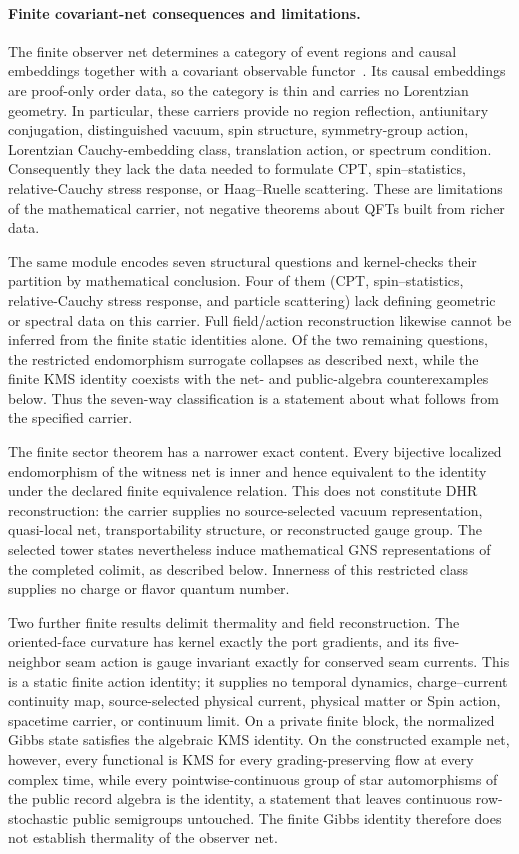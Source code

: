 \paragraph{Finite covariant-net consequences and limitations.}
The finite observer net determines a category of event regions and causal
embeddings together with a covariant observable functor~\cite{ophrepo}.  Its causal embeddings are
proof-only order data, so the category is thin and carries no Lorentzian
geometry.  In particular, these carriers provide no region reflection,
antiunitary conjugation, distinguished vacuum, spin structure, symmetry-group
action, Lorentzian Cauchy-embedding class, translation action, or spectrum condition.
Consequently they lack the data needed to formulate CPT, spin--statistics,
relative-Cauchy
stress response, or Haag--Ruelle scattering.  These are limitations of the
mathematical carrier, not negative theorems about QFTs built from richer
data.

The same module encodes seven structural questions and kernel-checks their
partition by mathematical conclusion.  Four of them (CPT, spin--statistics,
relative-Cauchy stress response, and particle scattering) lack defining
geometric or spectral data on this carrier.  Full field/action reconstruction
likewise cannot be inferred from the finite static identities alone.  Of the
two remaining questions, the restricted endomorphism surrogate collapses as
described next, while the finite KMS identity coexists with the net- and
public-algebra counterexamples below.  Thus the seven-way classification is a
statement about what follows from the specified carrier.

The finite sector theorem has a narrower exact content.  Every bijective
localized endomorphism of the witness net is inner and hence equivalent to the
identity under the declared finite equivalence relation.  This does not constitute DHR
reconstruction: the carrier supplies no source-selected vacuum
representation, quasi-local net, transportability structure, or reconstructed
gauge group.  The selected tower states nevertheless induce mathematical GNS
representations of the completed colimit, as described below.
Innerness of this restricted class supplies no charge or flavor quantum
number.

Two further finite results delimit thermality and field reconstruction.  The
oriented-face curvature has kernel exactly the port gradients, and its
five-neighbor seam action is gauge invariant exactly for conserved seam
currents.  This is a static finite action identity; it supplies no temporal
dynamics, charge--current continuity map, source-selected physical current,
physical matter or Spin action, spacetime carrier, or continuum limit.  On a
private finite block, the normalized Gibbs state satisfies the algebraic KMS
identity.  On the constructed example net, however, every functional is KMS
for every grading-preserving flow at every complex time, while every
pointwise-continuous group of star automorphisms of the public record
algebra is the identity, a statement that leaves continuous row-stochastic
public semigroups untouched.  The finite Gibbs identity
therefore does not establish thermality of the observer net.

